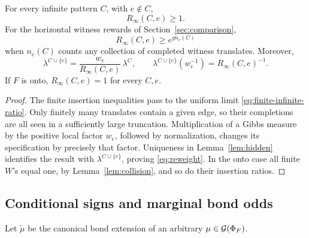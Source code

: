 \begin{lemma}\label{lem:insertion}
For every infinite pattern \(C\), with \(e\notin C\),
\begin{equation}
 R_\infty(C,e)\ge1.
\end{equation}
For the horizontal witness rewards of Section~\ref{sec:comparison},
\begin{equation}
 R_\infty(C,e)\ge e^{g n_e(C)}
 \label{eq:infinite-completion}
\end{equation}
when \(n_e(C)\) counts any collection of completed witness translates. Moreover,
\begin{equation}
 \lambda^{C\cup\{e\}}
 =\frac{w_e}{R_\infty(C,e)}\,\lambda^C,\qquad
 \lambda^{C\cup\{e\}}(w_e^{-1})=R_\infty(C,e)^{-1}.
 \label{eq:reweight}
\end{equation}
If \(F\) is onto, \(R_\infty(C,e)=1\) for every \(C,e\).
\end{lemma}
\begin{proof}
The finite insertion inequalities pass to the uniform limit \eqref{eq:finite-infinite-ratio}. Only finitely many translates contain a given edge, so their completions are all seen in a sufficiently large truncation. Multiplication of a Gibbs measure by the positive local factor \(w_e\), followed by normalization, changes its specification by precisely that factor. Uniqueness in Lemma~\ref{lem:hidden} identifies the result with \(\lambda^{C\cup\{e\}}\), proving \eqref{eq:reweight}. In the onto case all finite \(W\)'s equal one, by Lemma~\ref{lem:collision}, and so do their insertion ratios.
\end{proof}

\subsection{Conditional signs and marginal bond odds}

Let \(\widetilde\mu\) be the canonical bond extension of an arbitrary \(\mu\in\mathcal G(\Phi_F)\).

